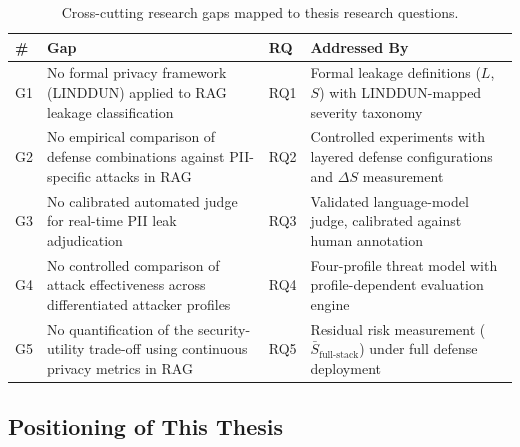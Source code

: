 \begin{table}[H]
\centering
\caption{Cross-cutting research gaps mapped to thesis research questions.}
\label{tab:gap-matrix}
\footnotesize

\begin{tabular}{C{0.5cm}W{6.5cm}C{1.2cm}W{4.5cm}}
\toprule

\textbf{\#} &
\textbf{Gap} &
\textbf{RQ} &
\textbf{Addressed By} \\
\midrule
G1 & No formal privacy framework (LINDDUN) applied to RAG leakage classification & RQ1 & Formal leakage definitions ($L$, $S$) with LINDDUN-mapped severity taxonomy \\
G2 & No empirical comparison of defense combinations against PII-specific attacks in RAG & RQ2 & Controlled experiments with layered defense configurations and $\Delta S$ measurement \\
G3 & No calibrated automated judge for real-time PII leak adjudication & RQ3 & Validated language-model judge, calibrated against human annotation \\
G4 & No controlled comparison of attack effectiveness across differentiated attacker profiles & RQ4 & Four-profile threat model with profile-dependent evaluation engine \\
G5 & No quantification of the security-utility trade-off using continuous privacy metrics in RAG & RQ5 & Residual risk measurement ($\bar{S}_{\text{full-stack}}$) under full defense deployment \\
\bottomrule
\end{tabular}
\end{table}

\subsection{Positioning of This Thesis}


